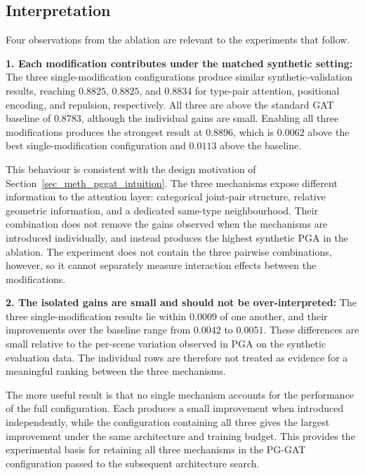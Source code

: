 \subsection{Interpretation}
\label{sec_res_pggat_ablations_discussion}

Four observations from the ablation are relevant to the experiments
that follow.

\textbf{1. Each modification contributes under the matched synthetic
setting:}
The three single-modification configurations produce similar
synthetic-validation results,
reaching $0.8825$,
$0.8825$,
and $0.8834$ for type-pair attention,
positional encoding,
and repulsion, respectively.
All three are above the standard GAT baseline of $0.8783$,
although the individual gains are small.
Enabling all three modifications produces the strongest result at $0.8896$,
which is $0.0062$ above the best single-modification configuration
and $0.0113$ above the baseline.

This behaviour is consistent with the design motivation of
Section~\ref{sec_meth_pggat_intuition}.
The three mechanisms expose different information to the attention layer:
categorical joint-pair structure,
relative geometric information,
and a dedicated same-type neighbourhood.
Their combination does not remove the gains observed when the mechanisms
are introduced individually,
and instead produces the highest synthetic PGA in the ablation.
The experiment does not contain the three pairwise combinations,
however, so it cannot separately measure interaction effects
between the modifications.

\textbf{2. The isolated gains are small and should not be
over-interpreted:}
The three single-modification results lie within $0.0009$ of one
another,
and their improvements over the baseline range from $0.0042$
to $0.0051$.
These differences are small relative to the per-scene variation
observed in PGA on the synthetic evaluation data.
The individual rows are therefore not treated as evidence
for a meaningful ranking between the three mechanisms.

The more useful result is that no single mechanism accounts for the
performance of the full configuration.
Each produces a small improvement when introduced independently,
while the configuration containing all three gives the largest
improvement under the same architecture and training budget.
This provides the experimental basis for retaining all three mechanisms
in the PG-GAT configuration passed to the subsequent architecture search.

